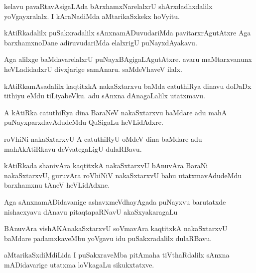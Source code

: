 \begin{mng}
kelavu pavaRtavAsigaLAda bArxhamxNarelalxrU shArxdadhxdalilx yoVgayxralalx. I kAraNadiMda aMtarikaSxkekx hoVyitu.
\end{mng}

\begin{mng}
kAtiRkadalilx puSakxradalilx sAnxnamADuvudariMda pavitarxrAgutAtxre Aga barxhamxnoDane adiruvudariMda elalxrigU puNayxdAyakavu.
\end{mng}

\begin{mng}
Aga alilxge baMdavarelalxrU puNayxBAgigaLAgutAtxre. avaru maMtarxvanunx heVLadidadxrU divxjarige samAnaru. saMdeVhaveV ilalx.
\end{mng}

\begin{mng}
kAtiRkamAsadalilx kaqtitxkA nakaSxtarxvu baMda catuthiRya dinavu doDaDx tithiyu eMdu tiLiyabeVku. adu sAnxna dAnagaLalilx utatxmavu.
\end{mng}

\begin{mng}
A kAtiRka catuthiRya dina BaraNeV nakaSxtarxvu baMdare adu mahA puNayxparxdavAdudeMdu QuSigaLu heVLidAdxre.
\end{mng}

\begin{mng}
roVhiNi nakaSxtarxvU A catuthiRyU oMdeV dina baMdare adu mahAkAtiRkavu deVvategaLigU dulaRBavu.
\end{mng}

\begin{mng}
kAtiRkada shanivAra kaqtitxkA nakaSxtarxvU bAnuvAra BaraNi nakaSxtarxvU, guruvAra roVhiNiV nakaSxtarxvU bahu utatxmavAdudeMdu barxhamxnu tAneV heVLidAdxne.
\end{mng}

\begin{mng}
Aga sAnxnamADidavanige ashavxmeVdhayAgada puNayxvu barutatxde nishacxyavu dAnavu pitaqtapaRNavU akaSxyakaragaLu
\end{mng}

\begin{mng}
BAnuvAra vishAKAnakaSxtarxvU soVmavAra kaqtitxkA nakaSxtarxvU baMdare padamxkaveMbu yoVgavu idu puSakxradalilx dulaRBavu.
\end{mng}

\begin{mng}
aMtarikaSxdiMdiLida I puSakxraveMba pitAmaha tiVthaRdalilx sAnxna mADidavarige utatxma loVkagaLu sikukxtatxve.
\end{mng}

